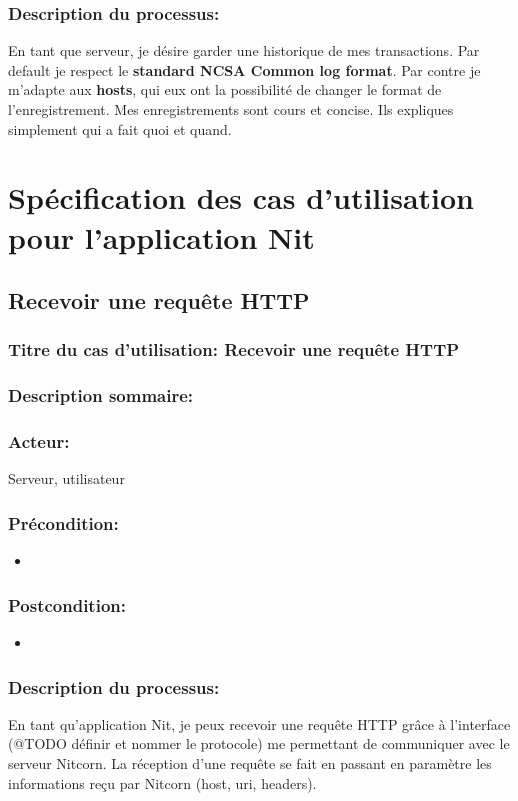 \documentclass{scrreprt}
\begin{document}
\subsubsection{Description du processus:}En tant que serveur, je désire garder une historique de mes transactions. Par
default je respect le \textbf{standard NCSA Common log format}. Par contre je m'adapte
aux \textbf{hosts}, qui eux ont la possibilité de changer le format de
l'enregistrement. Mes enregistrements sont cours et concise. Ils expliques
simplement qui a fait quoi et quand.

\section{Spécification des cas d'utilisation pour l'application Nit}
\subsection{Recevoir une requête HTTP}
\subsubsection{Titre du cas d'utilisation: Recevoir une requête HTTP}
\subsubsection{Description sommaire:}
\subsubsection{Acteur:} Serveur, utilisateur
\subsubsection{Précondition:}
\begin{itemize}
    \item  
\end{itemize} 
\subsubsection{Postcondition:}
\begin{itemize}
    \item  
\end{itemize} 
\subsubsection{Description du processus:}En tant qu'application Nit, je peux recevoir une requête HTTP grâce à l'interface
(@TODO définir et nommer le protocole) me permettant de communiquer avec le serveur
Nitcorn. La réception d'une requête se fait en passant en paramètre les informations
reçu par Nitcorn (host, uri, headers).
\end{document}
